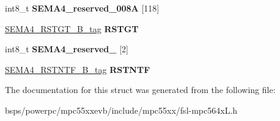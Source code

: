 \begin{DoxyCompactItemize}
int8\+\_\+t {\bfseries S\+E\+M\+A4\+\_\+reserved\+\_\+008A} \mbox{[}118\mbox{]}
\item 
\mbox{\label{structSEMA4__struct__tag_ac1f4967f3c37d916f33611b0093e4708}} 
\mbox{\hyperlink{unionSEMA4__RSTGT__16B__tag}{S\+E\+M\+A4\+\_\+\+R\+S\+T\+G\+T\+\_\+B\+\_\+tag}} {\bfseries R\+S\+T\+GT}
\item 
\mbox{\label{structSEMA4__struct__tag_ad64377e3eeb201b95ea05e48b7ffa417}} 
int8\+\_\+t {\bfseries S\+E\+M\+A4\+\_\+reserved\+\_} \mbox{[}2\mbox{]}
\item 
\mbox{\label{structSEMA4__struct__tag_a9c2946c631f0bf08f4ef1492c8cfcbf9}} 
\mbox{\hyperlink{unionSEMA4__RSTNTF__16B__tag}{S\+E\+M\+A4\+\_\+\+R\+S\+T\+N\+T\+F\+\_\+B\+\_\+tag}} {\bfseries R\+S\+T\+N\+TF}
\end{DoxyCompactItemize}


The documentation for this struct was generated from the following file\+:\begin{DoxyCompactItemize}
\item 
bsps/powerpc/mpc55xxevb/include/mpc55xx/fsl-\/mpc564x\+L.\+h\end{DoxyCompactItemize}
